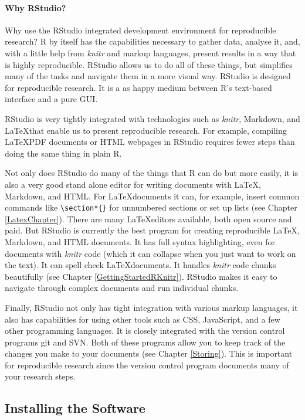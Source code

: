 \paragraph{Why RStudio?}

Why use the RStudio integrated development environment for reproducible research? R by itself has the capabilities necessary to gather data, analyse it, and, with a little help from {\emph{knitr}} and markup languages, present results in a way that is highly reproducible. RStudio allows us to do all of these things, but simplifies many of the tasks and navigate them in a more visual way. RStudio is designed for reproducible research. It is a as happy medium between R's text-based interface and a pure GUI. 

RStudio is very tightly integrated with technologies such as {\emph{knitr}}, Markdown, and \LaTeX that enable us to present reproducible research. For example, compiling \LaTeX PDF documents or HTML webpages in RStudio requires fewer steps than doing the same thing in plain R. 

Not only does RStudio do many of the things that R can do but more easily, it is also a very good stand alone editor for writing documents with \LaTeX, Markdown, and HTML. For \LaTeX documents it can, for example, insert common commands like \texttt{\textbackslash{}section*\{\}} for unnumbered sections or set up lists (see Chapter \ref{LatexChapter}).  There are many \LaTeX editors available, both open source and paid. But RStudio is currently the best program for creating reproducible \LaTeX, Markdown, and HTML documents. It has full syntax highlighting, even for documents with {\emph{knitr}} code (which it can collapse when you just want to work on the text). It can spell check \LaTeX documents. It handles {\emph{knitr}} code chunks beautifully (see Chapter \ref{GettingStartedRKnitr}). RStudio makes it easy to navigate through complex documents and run individual chunks. 

Finally, RStudio not only has tight integration with various markup languages, it also has capabilities for using other tools such as CSS, JavaScript, and a few other programming languages. It is closely integrated with the version control programs git and SVN. Both of these programs allow you to keep track of the changes you make to your documents (see Chapter \ref{Storing}). This is important for reproducible research since the version control program documents many of your research steps. 

\subsection{Installing the Software}\label{InstallR}

